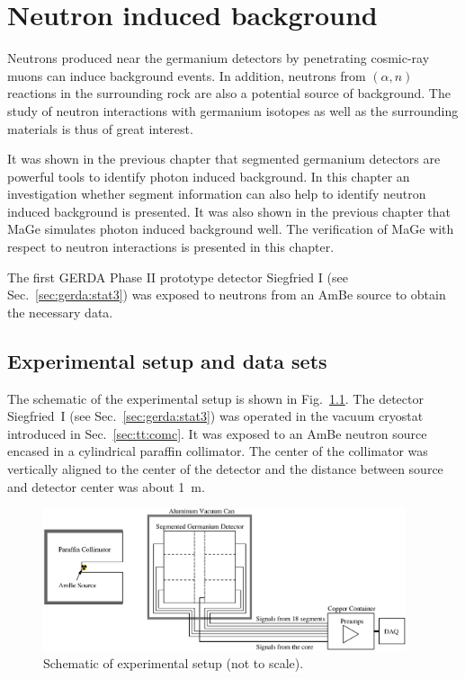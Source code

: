 \chapter{Neutron induced background}
\label{cha:neutron}
Neutrons produced near the germanium detectors by penetrating
cosmic-ray muons can induce background events. In addition, neutrons
from $(\alpha, n)$ reactions in the surrounding rock are also a
potential source of background. The study of neutron interactions with
germanium isotopes as well as the surrounding materials is thus of
great interest.

It was shown in the previous chapter that segmented germanium
detectors are powerful tools to identify photon induced background. In
this chapter an investigation whether segment information can also
help to identify neutron induced background is presented. It was also
shown in the previous chapter that MaGe \cite{Mag06, Mag08} simulates
photon induced background well. The verification of MaGe with respect
to neutron interactions is presented in this chapter.

The first GERDA Phase II prototype detector Siegfried I (see
Sec.~\ref{sec:gerda:stat3}) was exposed to neutrons from an AmBe
source to obtain the necessary data.

\section{Experimental setup and data sets}
\label{sec:neu:exp}
The schematic of the experimental setup is shown in
Fig.~\ref{fig:neu:exp}. The detector Siegfried~I (see
Sec.~\ref{sec:gerda:stat3}) was operated in the vacuum cryostat
introduced in Sec.~\ref{sec:tt:comc}. It was exposed to an AmBe
neutron source encased in a cylindrical paraffin collimator. The
center of the collimator was vertically aligned to the center of the
detector and the distance between source and detector center was about
1~m.

\begin{figure}[tbhp]
  \centering
  \includegraphics[width=0.95\textwidth]{neuExpSI}
  \caption{Schematic of experimental setup (not to scale).}
  \label{fig:neu:exp}
\end{figure}

